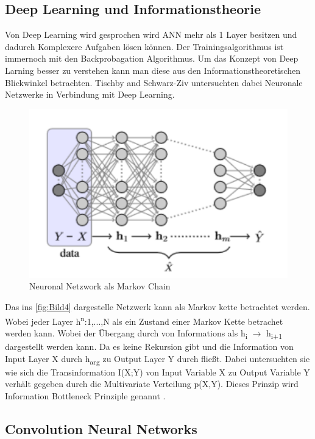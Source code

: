 \documentclass{llncs}
\begin{document}
\subsection{Deep Learning und Informationstheorie}

Von Deep Learning wird gesprochen wird ANN mehr als 1 Layer besitzen und dadurch Komplexere Aufgaben lösen können. Der Trainingsalgorithmus ist immernoch mit den Backprobagation Algorithmus. 
Um das Konzept von Deep Larning besser zu verstehen kann man diese aus den Informationstheoretischen Blickwinkel betrachten. Tischby and Schwarz-Ziv  \cite{infoth} untersuchten dabei Neuronale Netzwerke in Verbindung mit Deep Learning. 

\begin{figure}[htbp] 
	\centering
	\includegraphics[width=1.0\textwidth]{markovdeep.png}
	\caption{Neuronal Netzwork als Markov Chain}
	\label{fig:Bild1}
\end{figure}

Das ins \ref{fig:Bild4} dargestelle Netzwerk kann als Markov kette betrachtet werden. Wobei jeder Layer h\textsuperscript{n}:1,...,N als ein Zustand einer Markov Kette betrachet werden kann. Wobei der Übergang durch von Informations als h\textsubscript{i} $\rightarrow$ h\textsubscript{i+1} dargestellt werden kann. Da es keine Rekursion gibt und die Information von Input Layer X durch h\textsubscript{arg} zu Output Layer Y durch fließt. Dabei untersuchten sie wie sich die Transinformation I(X;Y) von Input Variable X zu Output Variable Y verhält gegeben durch die Multivariate Verteilung p(X,Y). Dieses Prinzip wird Information Bottleneck Prinziple genannt \cite{bottleneck}. 

\subsection{Convolution Neural Networks}
\end{document}
